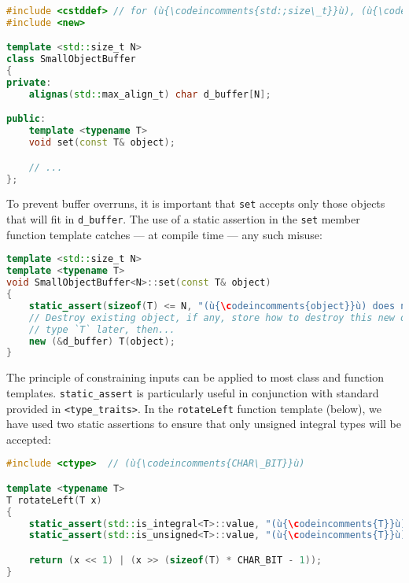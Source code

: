 %
%
\begin{lstlisting}[language=C++]
#include <cstddef> // for (ù{\codeincomments{std:;size\_t}}ù), (ù{\codeincomments{std::max\_align\_t}}ù)
#include <new>

template <std::size_t N>
class SmallObjectBuffer
{
private:
    alignas(std::max_align_t) char d_buffer[N];

public:
    template <typename T>
    void set(const T& object);

    // ...
};
\end{lstlisting}


\noindent To prevent buffer overruns, it is important that \lstinline!set! accepts
only those objects that will fit in \lstinline!d_buffer!. The use of a
static assertion in the \lstinline!set! member function template catches
--- at compile time --- any such misuse:

\begin{lstlisting}[language=C++]
template <std::size_t N>
template <typename T>
void SmallObjectBuffer<N>::set(const T& object)
{
    static_assert(sizeof(T) <= N, "(ù{\codeincomments{object}}ù) does not fit in the small buffer.");
    // Destroy existing object, if any, store how to destroy this new object of
    // type `T` later, then...
    new (&d_buffer) T(object);
}
\end{lstlisting}



The principle of constraining inputs can be applied to most class and
function templates. \lstinline!static_assert! is particularly useful in
conjunction with standard  provided in
\lstinline!<type_traits>!. In the \lstinline!rotateLeft! function template
(below), we have used two static assertions to ensure that only unsigned
integral types will be accepted:

\begin{lstlisting}[language=C++]
#include <ctype>  // (ù{\codeincomments{CHAR\_BIT}}ù)

template <typename T>
T rotateLeft(T x)
{
    static_assert(std::is_integral<T>::value, "(ù{\codeincomments{T}}ù) must be an integral type.");
    static_assert(std::is_unsigned<T>::value, "(ù{\codeincomments{T}}ù) must be an unsigned type.");

    return (x << 1) | (x >> (sizeof(T) * CHAR_BIT - 1));
}
\end{lstlisting}


